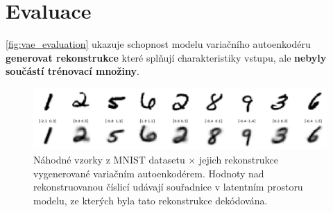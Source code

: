 \section{Evaluace}
\autoref{fig:vae_evaluation} ukazuje schopnost modelu variačního autoenkodéru \textbf{generovat rekonstrukce} které splňují charakteristiky vstupu, ale \textbf{nebyly součástí trénovací množiny}.
\begin{figure}[H]
    \centering
    \includegraphics[width=\textwidth]{figures/vae_model_reconstructions.png}
    \caption{Náhodné vzorky z MNIST datasetu $\times$ jejich rekonstrukce vygenerované variačním autoenkodérem. Hodnoty nad rekonstruovanou číslicí udávají souřadnice v latentním prostoru modelu, ze kterých byla tato rekonstrukce dekódována.}
    \label{fig:vae_evaluation}
\end{figure}